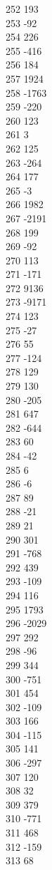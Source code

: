{ 252	193 \\
 253	-92 \\
 254	226 \\
 255	-416 \\
 256	184 \\
 257	1924 \\
 258	-1763 \\
 259	-220 \\
 260	123 \\
 261	3 \\
 262	125 \\
 263	-264 \\
 264	177 \\
 265	-3 \\
 266	1982 \\
 267	-2191 \\
 268	199 \\
 269	-92 \\
 270	113 \\
 271	-171 \\
 272	9136 \\
 273	-9171 \\
 274	123 \\
 275	-27 \\
 276	55 \\
 277	-124 \\
 278	129 \\
 279	130 \\
 280	-205 \\
 281	647 \\
 282	-644 \\
 283	60 \\
 284	-42 \\
 285	6 \\
 286	-6 \\
 287	89 \\
 288	-21 \\
 289	21 \\
 290	301 \\
 291	-768 \\
 292	439 \\
 293	-109 \\
 294	116 \\
 295	1793 \\
 296	-2029 \\
 297	292 \\
 298	-96 \\
 299	344 \\
 300	-751 \\
 301	454 \\
 302	-109 \\
 303	166 \\
 304	-115 \\
 305	141 \\
 306	-297 \\
 307	120 \\
 308	32 \\
 309	379 \\
 310	-771 \\
 311	468 \\
 312	-159 \\
 313	68 \\
}
